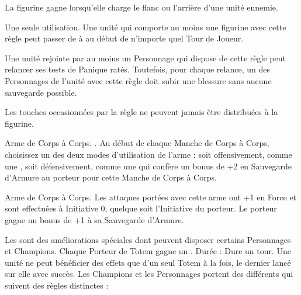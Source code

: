 \armyspecialruleentry{\packtactics}

La figurine gagne \swiftstride{} lorsqu'elle charge le flanc ou l'arrière d'une unité ennemie.

\armyspecialruleentry{\lootedbooze}

Une seule utilisation. Une unité qui comporte au moins une figurine avec cette règle peut passer de \sober{} à \drunk{} au début de n'importe quel Tour de Joueur.

\armyspecialruleentry{\bloodoffering}

Une unité rejointe par au moins un Personnage qui dispose de cette règle peut relancer ses tests de Panique ratés. Toutefois, pour chaque relance, un des Personnages de l'unité avec cette règle doit subir une blessure sans aucune sauvegarde possible.

\armyspecialruleentry{\halfhorse}

Les touches occasionnées par la règle \stomp{} ne peuvent jamais être distribuées à la figurine.

\closearmyspecialrules




\newpage
\startarmyarmoury

\startitemlistonecol

\listitemonecol{\soothsayerstaff}Arme de Corps à Corps. \requirestwohands{}. Au début de chaque Manche de Corps à Corps, choisissez un des deux modes d'utilisation de l'arme : soit offensivement, comme une \gw{}, soit défensivement, comme une \hw{} qui confère un bonus de +2 en Sauvegarde d'Armure au porteur pour cette Manche de Corps à Corps.

\listitemonecol{\beastaxe}Arme de Corps à Corps. Les attaques portées avec cette arme ont +1 en Force et sont effectuées à Initiative 0, quelque soit l'Initiative du porteur. Le porteur gagne un bonus de +1 à sa Sauvegarde d'Armure.

\enditemlistonecol

\closearmyarmoury





\startarmynewsectionSP{\totems}

\spaceaftersection{}

Les \totems{} sont des améliorations spéciales dont peuvent disposer certains Personnages et Champions. Chaque Porteur de Totem gagne un . Durée : Dure un tour. Une unité ne peut bénéficier des effets que d'un seul Totem à la fois, le dernier lancé sur elle avec succès. Les Champions et les Personnages portent des \totems{} différents qui suivent des règles distinctes :

